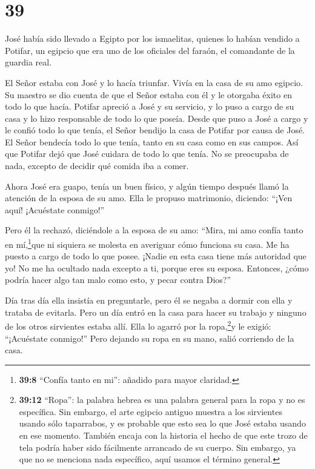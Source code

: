 \hypertarget{section-38}{%
\section{39}\label{section-38}}

 José había sido llevado a Egipto por los ismaelitas,
quienes lo habían vendido a Potifar, un egipcio que era uno de los
oficiales del faraón, el comandante de la guardia real.

 El Señor estaba con José y lo hacía triunfar. Vivía en la
casa de su amo egipcio.  Su maestro se dio cuenta de que el
Señor estaba con él y le otorgaba éxito en todo lo que hacía.
 Potifar apreció a José y su servicio, y lo puso a cargo de
su casa y lo hizo responsable de todo lo que poseía.  Desde
que puso a José a cargo y le confió todo lo que tenía, el Señor bendijo
la casa de Potifar por causa de José. El Señor bendecía todo lo que
tenía, tanto en su casa como en sus campos.  Así que Potifar
dejó que José cuidara de todo lo que tenía. No se preocupaba de nada,
excepto de decidir qué comida iba a comer.

Ahora José era guapo, tenía un buen físico,  y algún tiempo
después llamó la atención de la esposa de su amo. Ella le propuso
matrimonio, diciendo: ``¡Ven aquí! ¡Acuéstate conmigo!''

 Pero él la rechazó, diciéndole a la esposa de su amo:
``Mira, mi amo confía tanto en mí,\footnote{\textbf{39:8} ``Confía tanto
  en mi'': añadido para mayor claridad.}que ni siquiera se molesta en
averiguar cómo funciona su casa. Me ha puesto a cargo de todo lo que
posee.  ¡Nadie en esta casa tiene más autoridad que yo! No
me ha ocultado nada excepto a ti, porque eres su esposa. Entonces, ¿cómo
podría hacer algo tan malo como esto, y pecar contra Dios?''

 Día tras día ella insistía en preguntarle, pero él se
negaba a dormir con ella y trataba de evitarla.  Pero un
día entró en la casa para hacer su trabajo y ninguno de los otros
sirvientes estaba allí.  Ella lo agarró por la
ropa,\footnote{\textbf{39:12} ``Ropa'': la palabra hebrea es una palabra
  general para la ropa y no es específica. Sin embargo, el arte egipcio
  antiguo muestra a los sirvientes usando sólo taparrabos, y es probable
  que esto sea lo que José estaba usando en ese momento. También encaja
  con la historia el hecho de que este trozo de tela podría haber sido
  fácilmente arrancado de su cuerpo. Sin embargo, ya que no se menciona
  nada específico, aquí usamos el término general.}y le exigió:
``¡Acuéstate conmigo!'' Pero dejando su ropa en su mano, salió corriendo
de la casa.

